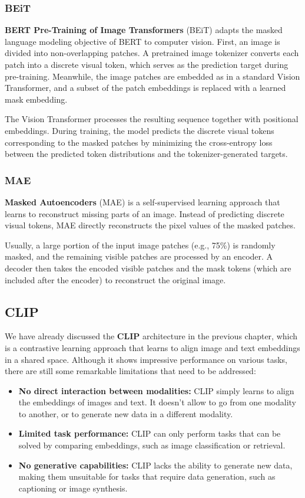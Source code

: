\subsubsection{BEiT}
\textbf{BERT Pre-Training of Image Transformers} (BEiT) adapts the masked language modeling objective of BERT to computer vision. 
First, an image is divided into non-overlapping patches. 
A pretrained image tokenizer converts each patch into a discrete visual token, which serves as the prediction target during pre-training. 
Meanwhile, the image patches are embedded as in a standard Vision Transformer, and a subset of the patch embeddings is replaced with a learned mask embedding. 

The Vision Transformer processes the resulting sequence together with positional embeddings. 
During training, the model predicts the discrete visual tokens corresponding to the masked patches by minimizing the cross-entropy loss between the predicted token distributions and the tokenizer-generated targets.

\subsubsection{MAE}
\textbf{Masked Autoencoders} (MAE) is a self-supervised learning approach that learns to reconstruct missing parts of an image.
Instead of predicting discrete visual tokens, MAE directly reconstructs the pixel values of the masked patches.

Usually, a large portion of the input image patches (e.g., 75\%) is randomly masked, and the remaining visible patches are processed by an encoder.
A decoder then takes the encoded visible patches and the mask tokens (which are included after the encoder) to reconstruct the original image.

\subsection{CLIP}
We have already discussed the \textbf{CLIP} architecture in the previous chapter, which is a contrastive learning approach that learns to align image and text embeddings in a shared space.
Although it shows impressive performance on various tasks, there are still some remarkable limitations that need to be addressed:
\begin{itemize}
    \item \textbf{No direct interaction between modalities:} CLIP simply learns to align the embeddings of images and text.
    It doesn't allow to go from one modality to another, or to generate new data in a different modality.
    \item \textbf{Limited task performance:} CLIP can only perform tasks that can be solved by comparing embeddings, such as image classification or retrieval.
    \item \textbf{No generative capabilities:} CLIP lacks the ability to generate new data, making them unsuitable for tasks that require data generation, such as captioning or image synthesis.
\end{itemize}

